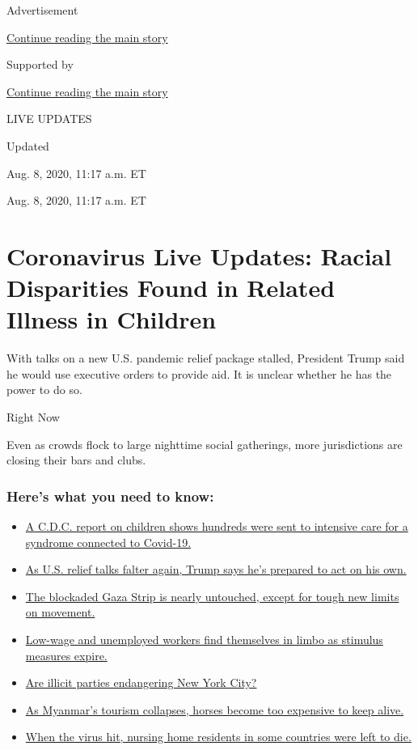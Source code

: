Advertisement

\protect\hyperlink{after-top}{Continue reading the main story}

Supported by

\protect\hyperlink{after-sponsor}{Continue reading the main story}

LIVE UPDATES

Updated~

Aug. 8, 2020, 11:17 a.m. ET

Aug. 8, 2020, 11:17 a.m. ET

\hypertarget{coronavirus-live-updates-racial-disparities-found-in-related-illness-in-children}{%
\section{Coronavirus Live Updates: Racial Disparities Found in Related
Illness in
Children}\label{coronavirus-live-updates-racial-disparities-found-in-related-illness-in-children}}

With talks on a new U.S. pandemic relief package stalled, President
Trump said he would use executive orders to provide aid. It is unclear
whether he has the power to do so.

Right Now

Even as crowds flock to large nighttime social gatherings, more
jurisdictions are closing their bars and clubs.

\hypertarget{heres-what-you-need-to-know}{%
\subsubsection{Here's what you need to
know:}\label{heres-what-you-need-to-know}}

\begin{itemize}
\tightlist
\item
  \protect\hyperlink{link-57c61e05}{A C.D.C. report on children shows
  hundreds were sent to intensive care for a syndrome connected to
  Covid-19.}
\item
  \protect\hyperlink{link-182e4a8e}{As U.S. relief talks falter again,
  Trump says he's prepared to act on his own.}
\item
  \protect\hyperlink{link-bb0ce1a}{The blockaded Gaza Strip is nearly
  untouched, except for tough new limits on movement.}
\item
  \protect\hyperlink{link-1f7e24cf}{Low-wage and unemployed workers find
  themselves in limbo as stimulus measures expire.}
\item
  \protect\hyperlink{link-17b89333}{Are illicit parties endangering New
  York City?}
\item
  \protect\hyperlink{link-3fdfb923}{As Myanmar's tourism collapses,
  horses become too expensive to keep alive.}
\item
  \protect\hyperlink{link-6cd5a1c2}{When the virus hit, nursing home
  residents in some countries were left to die.}
\end{itemize}

